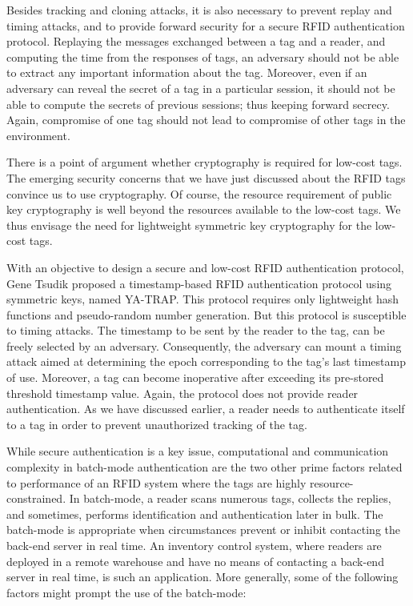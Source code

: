 \documentclass{easychair}
\begin{document}
Besides tracking and cloning attacks, it is also necessary to prevent replay and timing attacks, and to 
provide forward security for a secure RFID authentication protocol. Replaying the messages exchanged between a tag and a reader, and computing the time from the responses of tags, an
adversary should not be able to extract any important information about the tag. Moreover, even if an adversary can reveal the
secret of a tag in a particular session, it should not be able to compute the secrets of previous sessions; thus 
keeping forward secrecy. Again, compromise of one tag should not lead to compromise of other tags in the environment. 

There is a point of argument whether cryptography is required for low-cost tags. The emerging security concerns that we have just discussed about the RFID tags convince us to use cryptography. Of course, the resource requirement of public key cryptography is well beyond the resources available to the low-cost tags. We thus envisage the need for lightweight symmetric key cryptography for the low-cost tags. 

With an objective to design a secure and low-cost RFID authentication protocol, Gene Tsudik \cite{Tsudik} proposed a timestamp-based RFID authentication protocol using symmetric keys, named YA-TRAP. This protocol requires only lightweight hash functions and pseudo-random number generation. But this protocol is susceptible to timing attacks. 
The timestamp to be sent by the reader to the tag, can be freely selected by an adversary. Consequently, the 
adversary can mount a timing attack aimed at determining the epoch corresponding 
to the tag's last timestamp of use. Moreover, a tag can become inoperative after exceeding its pre-stored threshold timestamp value. Again, the protocol does not provide reader authentication. As we have discussed earlier, a reader needs to authenticate itself to a tag in order to prevent unauthorized tracking of the tag. 

While secure authentication is a key issue, computational and communication complexity in batch-mode authentication are the two other prime factors related to performance of an RFID system where the tags are highly resource-constrained. In batch-mode, a reader scans numerous tags, collects
the replies, and sometimes, performs identification and
authentication later in bulk. The batch-mode is appropriate
when circumstances prevent or inhibit contacting the back-end
server in real time. An inventory control system, where readers
are deployed in a remote warehouse and have no means of
contacting a back-end server in real time, is such an application. More generally, some of
the following factors might prompt the use of the batch-mode:
\end{document}
